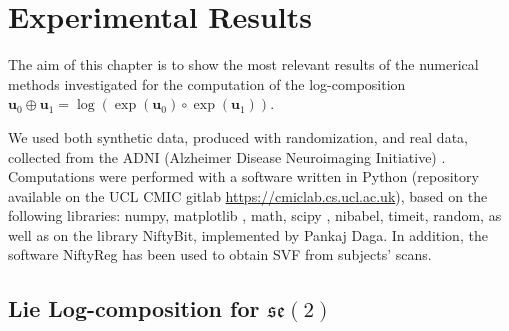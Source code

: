 \chapter{Experimental Results}\label{ch:results}

%


The aim of this chapter is to show the most relevant results of the numerical methods investigated for the computation of the log-composition $\mathbf{u}_0\oplus\mathbf{u}_1 = \log(\exp(\mathbf{u}_0)\circ \exp(\mathbf{u}_1))$.

We used both synthetic data, produced with randomization, and real data, collected from the ADNI (Alzheimer Disease Neuroimaging Initiative) \cite{jack2008alzheimer}.
Computations were performed with a software written in Python 
(repository available on the UCL CMIC gitlab \href{https://cmiclab.cs.ucl.ac.uk}{https://cmiclab.cs.ucl.ac.uk}), based on 
the following libraries: numpy, matplotlib \cite{hunter2007}, math, scipy \cite{scipy}, nibabel, timeit, random, as well as on the library NiftyBit, implemented by Pankaj Daga. In addition, the software NiftyReg \cite{modat2010fast} has been used to obtain SVF from subjects' scans. 

\section{Lie Log-composition for $\mathfrak{se}(2)$}

